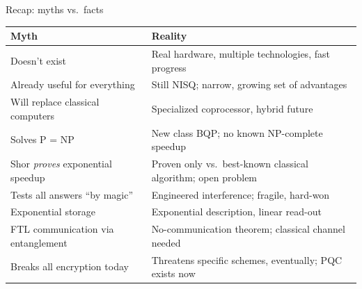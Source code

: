 \documentclass[aspectratio=169,11pt]{beamer}
\begin{document}
\begin{frame}{Recap: myths vs.\ facts}
  \scriptsize
  \begin{tabular}{@{}p{6.3cm}p{6.3cm}@{}}
    \toprule
    \textbf{Myth} & \textbf{Reality} \\
    \midrule
    Doesn't exist & Real hardware, multiple technologies, fast progress \\
    Already useful for everything & Still NISQ; narrow, growing set of advantages \\
    Will replace classical computers & Specialized coprocessor, hybrid future \\
    Solves P = NP & New class BQP; no known NP-complete speedup \\
    Shor \emph{proves} exponential speedup & Proven only vs.\ best-known classical algorithm; open problem \\
    Tests all answers ``by magic'' & Engineered interference; fragile, hard-won \\
    Exponential storage & Exponential description, linear read-out \\
    FTL communication via entanglement & No-communication theorem; classical channel needed \\
    Breaks all encryption today & Threatens specific schemes, eventually; PQC exists now \\
    \bottomrule
  \end{tabular}
\end{frame}
\end{document}
